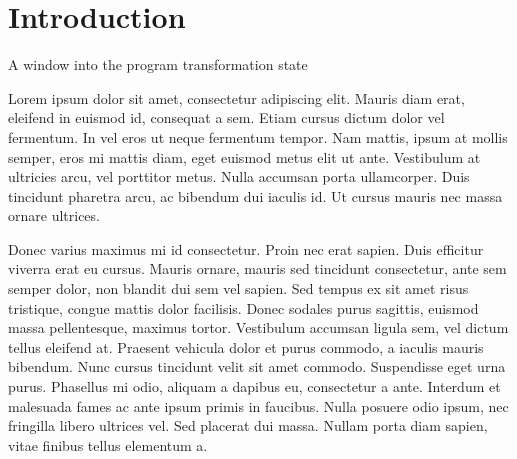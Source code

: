 \section{Introduction}
\label{sec:intro}







A window into the program transformation state




Lorem ipsum dolor sit amet, consectetur adipiscing elit. Mauris diam erat, eleifend in euismod id, consequat a sem. Etiam cursus dictum dolor vel fermentum. In vel eros ut neque fermentum tempor. Nam mattis, ipsum at mollis semper, eros mi mattis diam, eget euismod metus elit ut ante. Vestibulum at ultricies arcu, vel porttitor metus. Nulla accumsan porta ullamcorper. Duis tincidunt pharetra arcu, ac bibendum dui iaculis id. Ut cursus mauris nec massa ornare ultrices.

Donec varius maximus mi id consectetur. Proin nec erat sapien. Duis efficitur viverra erat eu cursus. Mauris ornare, mauris sed tincidunt consectetur, ante sem semper dolor, non blandit dui sem vel sapien. Sed tempus ex sit amet risus tristique, congue mattis dolor facilisis. Donec sodales purus sagittis, euismod massa pellentesque, maximus tortor. Vestibulum accumsan ligula sem, vel dictum tellus eleifend at. Praesent vehicula dolor et purus commodo, a iaculis mauris bibendum. Nunc cursus tincidunt velit sit amet commodo. Suspendisse eget urna purus. Phasellus mi odio, aliquam a dapibus eu, consectetur a ante. Interdum et malesuada fames ac ante ipsum primis in faucibus. Nulla posuere odio ipsum, nec fringilla libero ultrices vel. Sed placerat dui massa. Nullam porta diam sapien, vitae finibus tellus elementum a.


